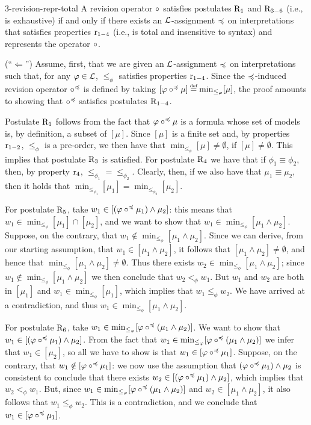 \begin{thm}{}{3-revision-repr-total}
	A revision operator $\circ$ satisfies postulates 
	$\mathrm{R}_{1}$ and $\mathrm{R}_{3-6}$ (i.e., is exhaustive)
	if and only if there exists	an 
	$\mathcal{L}$-assignment $\preccurlyeq$ on interpretations
	that satisfies properties $\mathrm{r}_{1-4}$
	(i.e., is total and insensitive to syntax)
	and represents the operator $\circ$.
\end{thm}
\begin{prf*}{}{}%
	(``$\Leftarrow$'')
	Assume, first, that we are given an $\mathcal{L}$-assignment $\preccurlyeq$ on interpretations
	such that, for any $\varphi\in\mathcal{L}$,	$\le_\phi$ satisfies properties $\mathrm{r}_{1-4}$.
	Since the $\preccurlyeq$-induced revision operator $\circ^\preccurlyeq$ is
	defined by taking $[\phi\re^\as\mu]\defeq\min_{\le_\phi}[\mu]$, 
	the proof amounts to showing that $\circ^\preccurlyeq$ satisfies postulates $\mathrm{R}_{1-4}$.
	
	Postulate $\mathrm{R}_{1}$ follows from the fact that 
	$\varphi\circ^\preccurlyeq\mu$ is a formula whose set of models is, by definition,
	a subset of $[\mu]$. Since $[\mu]$ is a finite set and, by properties $\mathrm{r}_{1-2}$,
	$\le_\phi$ is a pre-order, we then have 
	that $\min_{\le_\phi}[\mu]\neq\emptyset$, if $[\mu]\neq\emptyset$.
	This implies that postulate $\mathrm{R}_{3}$ is satisfied.
	For postulate $\mathrm{R}_{4}$ we have that if 
	$\phi_1\equiv\phi_2$, then, by property $\mathrm{r}_{4}$, 
	$\le_{\phi_1}=\le_{\phi_2}$.
	Clearly, then, if we also have that $\mu_1\equiv\mu_2$, 
	then it holds that $\min_{\le_{\phi_1}}[\mu_1]=\min_{\le_{\phi_2}}[\mu_2]$. 
	
	For postulate $\mathrm{R}_{5}$, take $w_1\in[(\varphi\circ^\preccurlyeq\mu_1)\land\mu_2]$: this means that 
	$w_1\in\min_{\le_\phi}[\mu_1]\cap[\mu_2]$, and we want to show that 
	$w_1\in\min_{\le_\phi}[\mu_1\land\mu_2]$.
	Suppose, on the contrary, that $w_1\notin\min_{\le_\phi}[\mu_1\land\mu_2]$.
	Since we can derive, from our starting assumption, that $w_1\in[\mu_1\land\mu_2]$,
	it follows that $[\mu_1\land\mu_2]\neq\emptyset$,
	and hence that $\min_{\le_\phi}[\mu_1\land\mu_2]\neq\emptyset$.
	Thus there exists $w_2\in\min_{\le_\phi}[\mu_1\land\mu_2]$;
	since $w_1\notin\min_{\le_\phi}[\mu_1\land\mu_2]$
	we then conclude that $w_2<_\phi w_1$.
	But $w_1$ and $w_2$ are both in $[\mu_1]$ and $w_1\in\min_{\le_\phi}[\mu_1]$,
	which implies that $w_1\le_\phi w_2$. We have arrived at a contradiction,
	and thus $w_1\in\min_{\le_\phi}[\mu_1\land\mu_2]$.
	
	For postulate $\mathrm{R}_{6}$, take $w_1\in{\operatorname{min}}_{\le_\varphi}[\varphi\circ^\preccurlyeq(\mu_1\land\mu_2)]$.
	We want to show that $w_1\in[(\varphi\circ^\preccurlyeq\mu_1)\land\mu_2]$.
	From the fact that $w_1\in{\operatorname{min}}_{\le_\varphi}[\varphi\circ^\preccurlyeq(\mu_1\land\mu_2)]$
	we infer that $w_1\in[\mu_2]$,
	so all we have to show is that $w_1\in[\varphi\circ^\preccurlyeq\mu_1]$.
	Suppose, on the contrary, that $w_1\notin[\varphi\circ^\preccurlyeq\mu_1]$:
	we now use the assumption that $(\varphi\circ^\preccurlyeq\mu_1)\land\mu_2$ is consistent 
	to conclude that there exists $w_2\in[(\varphi\circ^\preccurlyeq\mu_1)\land\mu_2]$,
	which implies that $w_2<_\phi w_1$.
	But, since $w_1\in{\operatorname{min}}_{\le_\varphi}[\varphi\circ^\preccurlyeq(\mu_1\land\mu_2)]$
	and $w_2\in[\mu_1\land\mu_2]$, it also follows that $w_1\le_\phi w_2$.
	This is a contradiction, and we conclude that $w_1\in[\varphi\circ^\preccurlyeq\mu_1]$.
	

\end{prf*}
